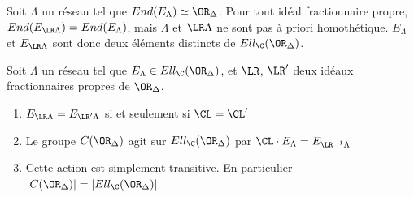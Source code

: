 Soit $\Lambda$ un réseau tel que $End(E_{\Lambda}) \simeq \OR_{\Delta}$. Pour tout idéal fractionnaire propre, $End(E_{\LR\Lambda}) = End(E_{\Lambda})$, mais $\Lambda$ et $\LR\Lambda$ ne sont pas à priori homothétique. $E_{\Lambda}$ et $E_{\LR\Lambda}$ sont donc deux éléments distincts de $Ell_{\C}(\OR_{\Delta})$. 

\begin{Prop}
	Soit $\Lambda$ un réseau tel que $E_{\Lambda}\in Ell_{\C}(\OR_{\Delta})$, et $\LR$, $\LR'$ deux idéaux fractionnaires propres de $\OR_{\Delta}$. 
	\begin{enumerate}
		\item $E_{\LR\Lambda} = E_{\LR'\Lambda}$ si et seulement si $\CL = \CL'$
		\item Le groupe $C(\OR_{\Delta})$ agit sur $Ell_{\C}(\OR_{\Delta})$ par $\CL\cdot E_{\Lambda} = E_{\LR^{-1}\Lambda}$
		\item Cette action est simplement transitive. En particulier $\left| C(\OR_{\Delta})\right| = \left| Ell_{\C}(\OR_{\Delta})\right| $
	\end{enumerate}
\end{Prop}

